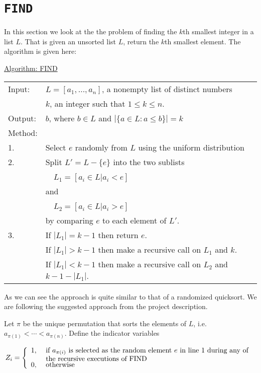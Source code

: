 \documentclass[article,a4paper,oneside]{memoir}
\newcommand{\+}[1]{\ensuremath{\boldsymbol{#1}}}
\begin{document}
\chapter{\texttt{FIND}}
In this section we look at the the problem of finding the $k$th smallest integer in a list $L$. That is given an unsorted list $L$, return the $k$th smallest element.
The algorithm is given here:
\begin{center}\begin{minipage}{5in}
\underline{Algorithm: FIND}\\
\begin{tabular}{ll}
Input: & $L=[a_1,\ldots,a_n]$, a nonempty list of distinct numbers\\
& $k$, an integer such that $1\leq k\leq n$.\\ 
Output: & $b$, where $b\in L$ and $|\{a\in L:a\leq b\}|=k$\\
Method:\\
{\hfill}1. & Select $e$ randomly from $L$ using the uniform distribution\\
{\hfill}2. & Split $L'=L-\{e\}$ into the two sublists\\
& \ \ $L_1=[a_i\in L|a_i<e]$\\
& and\\
& \ \ $L_2=[a_i\in L|a_i>e]$\\
& by comparing $e$ to each element of $L'$.\\
{\hfill}3. & If $|L_1|=k-1$ then return $e$.\\
& If $|L_1|>k-1$ then make a recursive call on $L_1$ and $k$.\\
& \begin{minipage}{4in}
If $|L_1|<k-1$ then make a recursive call on $L_2$ and $k-1-|L_1|$.
\end{minipage}
\end{tabular}
\end{minipage}\end{center}
As we can see the approach is quite similar to that of a randomized quicksort.
We are following the suggested approach from the project description.
\par

Let $\pi$ be the unique permutation that sorts the elements of $L$,
i.e. $a_{\pi(1)}<\cdots <a_{\pi(n)}$.  Define the indicator variables

$$Z_{i}=\left\{\begin{array}{ll}
1, & \mbox{
\begin{minipage}[t]{4in}
  if $a_{\pi(i)}$ is selected as the random element $e$ in line 1
  during any of the recursive executions of FIND
\end{minipage}
}
\\
0, & \mbox{ otherwise}
\end{array}\right.$$
\end{document}

